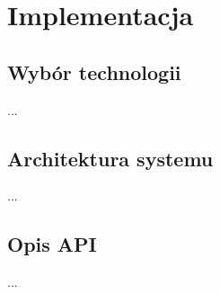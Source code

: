 \chapter{Implementacja}

\section{Wybór technologii}
...

\section{Architektura systemu}
...

\section{Opis API}
...